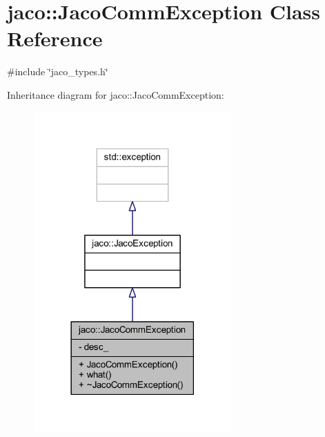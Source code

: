 \hypertarget{classjaco_1_1JacoCommException}{}\section{jaco\+:\+:Jaco\+Comm\+Exception Class Reference}
\label{classjaco_1_1JacoCommException}


{\ttfamily \#include \char`\"{}jaco\+\_\+types.\+h\char`\"{}}



Inheritance diagram for jaco\+:\+:Jaco\+Comm\+Exception\+:
\nopagebreak
\begin{figure}[H]
\begin{center}
\leavevmode
\includegraphics[width=213pt]{d5/d20/classjaco_1_1JacoCommException__inherit__graph}
\end{center}
\end{figure}


